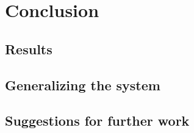 \chapter{Conclusion}

\label{Chapter6}



\section{Results} %
\label{sec:results}


\section{Generalizing the system} %
\label{sec:generalizing_the_system}


\section{Suggestions for further work} %
\label{sec:suggestions_for_further_work}

